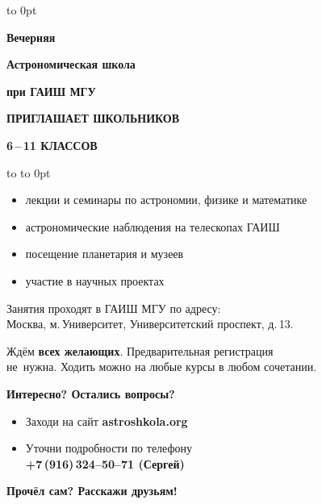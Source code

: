 \documentclass[a5paper,12pt]{article}
\begin{document}
\vbox to 0pt{%
}%
\vskip14pt
\centerline{\Large\textbf{Вечерняя}}
\vskip6pt
\centerline{\huge\textbf{Астрономическая школа}}
\vskip6pt
\centerline{\large\textbf{при ГАИШ МГУ}}
\vskip9pt
\centerline{\Large\textsf{\textbf{ПРИГЛАШАЕТ ШКОЛЬНИКОВ}}}
\vskip 9pt
\centerline{\Large\textsf{\textbf{6\,--\,11 КЛАССОВ}}}
\vskip12pt
\hbox to 
\vskip-24pt\hbox to 0pt{}

{\large%
\begin{itemize}
\setlength{\itemsep}{-4pt}
\setlength{\parindent}{0pt}
\item лекции и семинары по астрономии, физике и математике
\item астрономические наблюдения на телескопах ГАИШ
\item посещение планетария и музеев
\item участие в научных проектах
\end{itemize}


Занятия проходят в ГАИШ МГУ по адресу:\\Москва, м.\,Университет,
Университетский проспект, д.\,13.

\bigskip

Ждём \textbf{всех желающих}. Предварительная регистрация\\
не~нужна. Ходить можно на любые курсы в любом сочетании.

\vskip12pt

\textsf{\textbf{Интересно? Остались вопросы?}}
\begin{itemize}
\setlength{\itemsep}{-4pt}
\item Заходи на сайт \textbf{astroshkola.org}
\item Уточни подробности по телефону\\
\textbf{+7\,(916)\,324--50--71 (Сергей)}
\end{itemize}

\textsf{\textbf{Прочёл сам? Расскажи друзьям!}}

}%
\end{document}
